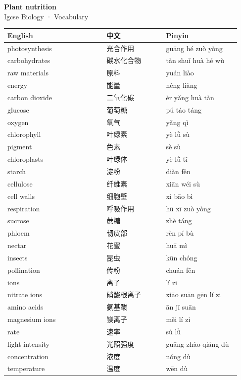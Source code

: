 \documentclass[11pt]{article}
\begin{document}
\begin{center}
  {\LARGE\bfseries Plant nutrition}\\[0.35em]
  {\large Igcse Biology · Vocabulary}
\end{center}
\vspace{0.6em}

\begin{longtable}{@{}p{0.40\linewidth}p{0.24\linewidth}p{0.30\linewidth}@{}}
\toprule
\textbf{English} & \textbf{中文} & \textbf{Pinyin} \\
\midrule
\endhead
\bottomrule
\endlastfoot
photosynthesis & 光合作用 & guāng hé zuò yòng \\
carbohydrates & 碳水化合物 & tàn shuǐ huà hé wù \\
raw materials & 原料 & yuán liào \\
energy & 能量 & néng liàng \\
carbon dioxide & 二氧化碳 & èr yǎng huà tàn \\
glucose & 葡萄糖 & pú táo táng \\
oxygen & 氧气 & yǎng qì \\
chlorophyll & 叶绿素 & yè lǜ sù \\
pigment & 色素 & sè sù \\
chloroplasts & 叶绿体 & yè lǜ tǐ \\
starch & 淀粉 & diàn fěn \\
cellulose & 纤维素 & xiān wéi sù \\
cell walls & 细胞壁 & xì bāo bì \\
respiration & 呼吸作用 & hū xī zuò yòng \\
sucrose & 蔗糖 & zhè táng \\
phloem & 韧皮部 & rèn pí bù \\
nectar & 花蜜 & huā mì \\
insects & 昆虫 & kūn chóng \\
pollination & 传粉 & chuán fěn \\
ions & 离子 & lí zi \\
nitrate ions & 硝酸根离子 & xiāo suān gēn lí zi \\
amino acids & 氨基酸 & ān jī suān \\
magnesium ions & 镁离子 & měi lí zi \\
rate & 速率 & sù lǜ \\
light intensity & 光照强度 & guāng zhào qiáng dù \\
concentration & 浓度 & nóng dù \\
temperature & 温度 & wēn dù \\

\end{longtable}
\end{document}
